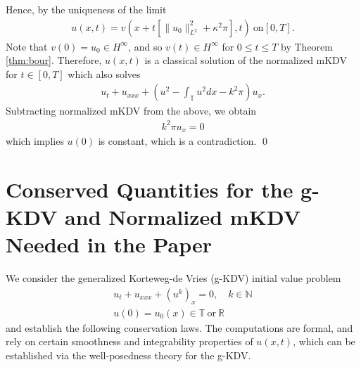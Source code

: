 \documentclass[12pt,reqno]{amsart}
\numberwithin{equation}{section}  %
\newcommand{\rr}{\mathbb{R}}
\newcommand{\ci}{\mathbb{T}}
\begin{document}
%
%
Hence, by the uniqueness of the limit
%
%
\begin{equation*}
\begin{split}
  u(x,t) = v(x + t [\|u_{0}  \|_{L^{2}}^{2} + \kappa^{2} \pi],t) \ \text{on} \left[
  0,T \right].
\end{split}
\end{equation*}
%
%
Note that $v(0) = u_{0} \in H^{\infty}$, and so $v(t) \in H^{\infty}$ for
$0 \le t \le T$ by Theorem \ref{thm:bour}. Therefore, $u(x,t)$ is a classical solution of the normalized mKDV for $t \in
[0,T]$ which also solves
%
%
\begin{equation*}
\begin{split}
  u_{t} + u_{xxx} + \left( u^{2} - \int_{\ci} u^{2} dx  - k^{2} \pi
  \right)u_{x}.
\end{split}
\end{equation*}
%
%
Subtracting normalized mKDV from the above, we obtain
%
%
\begin{equation*}
\begin{split}
  k^{2} \pi u_{x} = 0
\end{split}
\end{equation*}
%
%
which implies $u(0)$ is constant, which is a contradiction. \qed
    

\appendix
\section{Conserved Quantities for the g-KDV and Normalized mKDV Needed in the Paper}
We consider the generalized Korteweg-de Vries (g-KDV) initial value problem
%
%
\begin{gather}
  u_{t} + u_{xxx} + (u^{k})_{x} = 0, \quad k \in \mathbb{N}
  \label{gkdv}
  \\
  u(0) = u_{0}(x) \in \ci \ \text{or} \ \rr
  \label{gkdv-init}
\end{gather}
%
%
and establish the following conservation laws. The computations are formal, and
rely on certain smoothness and integrability properties of $u(x,t)$, which can
be established via the well-posedness theory for the g-KDV. 
\end{document}

